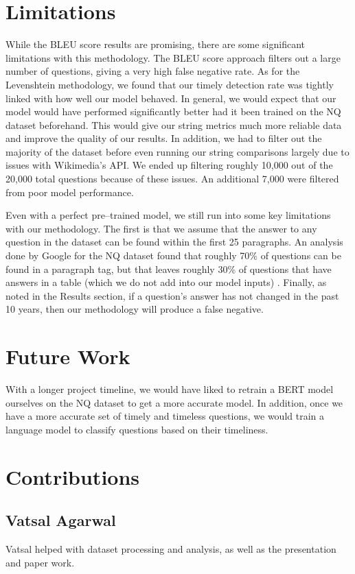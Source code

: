 \documentclass{article}
\begin{document}
\section{Limitations}
While the BLEU score results are promising, there are some significant limitations with this methodology. The BLEU score approach filters out a large number of questions, giving a very high false negative rate. As for the Levenshtein methodology, we found that our timely detection rate was tightly linked with how well our model behaved. In general, we would expect that our model would have performed significantly better had it been trained on the NQ dataset beforehand. This would give our string metrics much more reliable data and improve the quality of our results. In addition, we had to filter out the majority of the dataset before even running our string comparisons largely due to issues with Wikimedia's API. We ended up filtering roughly 10,000 out of the 20,000 total questions because of these issues. An additional 7,000 were filtered from poor model performance.

Even with a perfect pre--trained model, we still run into some key limitations with our methodology. The first is that we assume that the answer to any question in the dataset can be found within the first 25
paragraphs. An analysis done by Google for the NQ dataset found that roughly 70\% of questions can be
found in a paragraph tag, but that leaves roughly 30\% of questions that have answers in a table (which we do not add into our model inputs) \cite{nqdataset}. Finally, as noted in the Results section, if a question’s answer has not
changed in the past 10 years, then our methodology will produce a false negative.


\section{Future Work}
With a longer project timeline, we would have liked to retrain a BERT model ourselves on the NQ dataset to get a more accurate model. In addition, once we have a more accurate set of timely and timeless questions, we would train a language model to classify questions based on their timeliness. 

\section{Contributions}
\subsection{Vatsal Agarwal}
Vatsal helped with dataset processing and analysis, as well as the presentation and paper work. 
\end{document}
